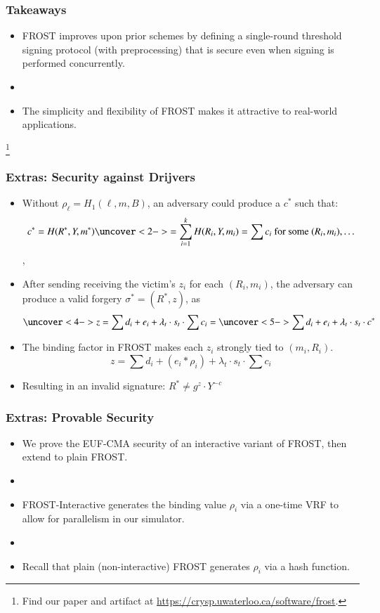 \documentclass[hyperref={pdfpagelabels=true},table,dvipsnames,14pt,aspectratio=169]{beamer}
\begin{document}
\begin{frame}
  \frametitle{Takeaways}
  \begin{itemize}
    \item<1-> FROST improves upon prior schemes by defining a
      single-round threshold signing protocol (with preprocessing) that is
      secure even when signing is performed concurrently.
    \item[]
    \item<2-> The simplicity and flexibility of FROST makes it attractive to
      real-world applications.
  \end{itemize}
      \let\thefootnote\relax\footnote{
      Find our paper and artifact at
      \url{https://crysp.uwaterloo.ca/software/frost}.
      }
\end{frame}


\begin{frame}
  \frametitle{Extras: Security against Drijvers}
  \small

  \begin{itemize}
    \item<1->[] Without $\rho_\ell = H_1(\ell, m, B) $,
  an adversary could produce a $c^*$ such that:
      \[ c^*= H(R^*, Y, m^*) \uncover<2->{ = \sum_{i=1}^{k} H(R_i, Y, m_i)  =
      \sum c_i  \text{ for some } (R_i, m_i), \dots } \],
    \item<3->[] After sending receiving the victim's $z_i$ for each $(R_i, m_i)$, the
  adversary can produce a valid forgery $\sigma^*=(R^*, z)$, as
      \[ \uncover<4-> {z = \sum d_i + e_i + \lambda_t \cdot s_t \cdot \sum c_i} = \uncover<5->
      { \sum d_i + e_i + \lambda_t \cdot s_t \cdot c^*} \]
    \item<6->[] The binding factor in FROST makes each $z_i$ strongly tied to
      $(m_i, R_i)$.
      \[ z = \sum d_i + (e_i * \rho_i) + \lambda_t \cdot s_t \cdot \sum c_i  \]
    \item<7->[] Resulting in an invalid signature: $R^* \neq g^z \cdot Y^{-c}$
  \end{itemize}
\end{frame}

\begin{frame}
  \frametitle{Extras: Provable Security}

  \begin{itemize}
    \item<1-> We prove the EUF-CMA security of an interactive variant of FROST,
      then extend to plain FROST.
    \item[]
    \item<2-> FROST-Interactive generates the
      binding value $\rho_i$ via a one-time VRF to allow for parallelism in our
      simulator.
    \item[]
    \item<3->Recall that plain (non-interactive) FROST generates $\rho_i$ via a
      hash function.
  \end{itemize}
\end{frame}
\end{document}
